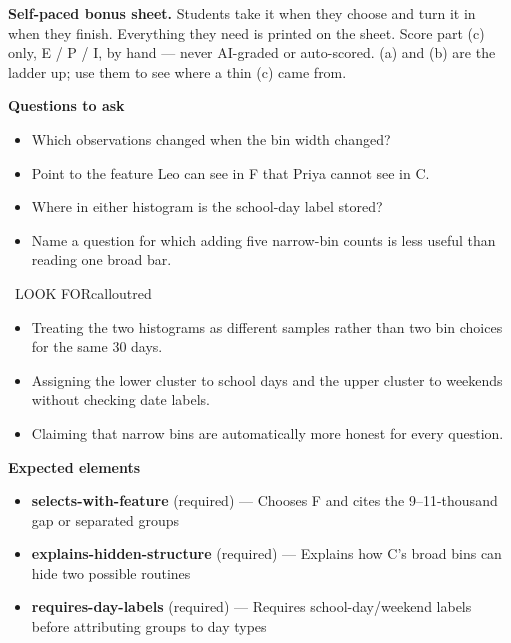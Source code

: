 \documentclass[11pt]{article}
\begin{document}
\textbf{Self-paced bonus sheet.} Students take it when they choose and turn it in when they finish. Everything they need is printed on the sheet. Score part (c) only, E / P / I, by hand --- never AI-graded or auto-scored. (a) and (b) are the ladder up; use them to see where a thin (c) came from.\par

\textbf{Questions to ask}
\begin{itemize}[leftmargin=1.5em,itemsep=2pt,topsep=2pt]
  \item Which observations changed when the bin width changed?
  \item Point to the feature Leo can see in F that Priya cannot see in C.
  \item Where in either histogram is the school-day label stored?
  \item Name a question for which adding five narrow-bin counts is less useful than reading one broad bar.
\end{itemize}

\begin{callout}{\IconWarn\ LOOK FOR}{calloutred}
\begin{itemize}[leftmargin=1.5em,itemsep=2pt,topsep=2pt]
  \item Treating the two histograms as different samples rather than two bin choices for the same 30 days.
  \item Assigning the lower cluster to school days and the upper cluster to weekends without checking date labels.
  \item Claiming that narrow bins are automatically more honest for every question.
\end{itemize}
\end{callout}


\textbf{Expected elements}
\begin{itemize}[leftmargin=1.5em,itemsep=2pt,topsep=2pt]
  \item \textbf{selects-with-feature} (required) --- Chooses F and cites the 9--11-thousand gap or separated groups
  \item \textbf{explains-hidden-structure} (required) --- Explains how C's broad bins can hide two possible routines
  \item \textbf{requires-day-labels} (required) --- Requires school-day/weekend labels before attributing groups to day types
\end{itemize}
\end{document}
